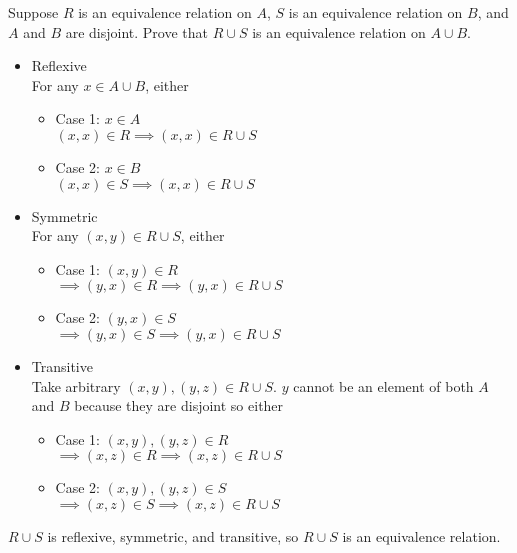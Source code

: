 \documentclass[paper=a4, fontsize=11pt]{jhwhw} %
\begin{document}
Suppose $R$ is an equivalence relation on $A$, $S$ is an equivalence relation on $B$, and $A$ and $B$ are disjoint. Prove that $R\cup S$ is an equivalence relation on $A\cup B$.
\solution
\begin{itemize}
    \item Reflexive\\
        For any $x\in A\cup B$, either
        \begin{itemize}
            \item Case 1: $x\in A$\\
                $(x, x)\in R\implies (x, x)\in R\cup S$
            \item Case 2: $x\in B$\\
                $(x, x)\in S\implies (x, x)\in R\cup S$
        \end{itemize}
    \item Symmetric\\
        For any $(x, y)\in R\cup S$, either
        \begin{itemize}
            \item Case 1: $(x, y)\in R$\\
                $\implies (y, x)\in R\implies (y, x)\in R\cup S$
            \item Case 2: $(y, x)\in S$\\
                $\implies (y, x)\in S\implies (y, x)\in R\cup S$
        \end{itemize}
    \item Transitive\\
        Take arbitrary $(x, y), (y, z)\in R\cup S$. $y$ cannot be an element of both $A$ and $B$ because they are disjoint so either
        \begin{itemize}
            \item Case 1: $(x, y), (y, z)\in R$\\
                $\implies (x, z)\in R\implies (x, z)\in R\cup S$
            \item Case 2: $(x, y), (y, z)\in S$\\
                $\implies (x, z)\in S\implies (x, z)\in R\cup S$
        \end{itemize}
\end{itemize}
$R\cup S$ is reflexive, symmetric, and transitive, so $R\cup S$ is an equivalence relation.
\end{document}
